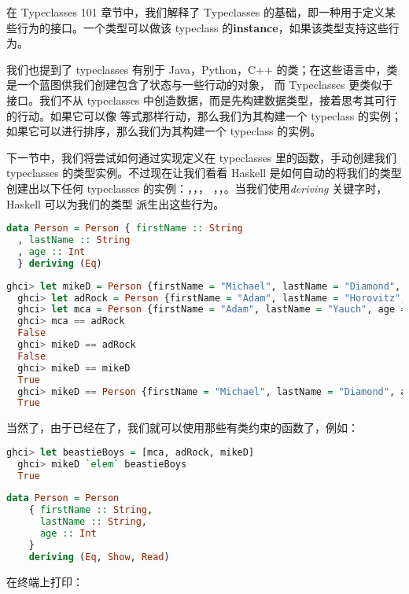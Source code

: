 \documentclass[./main.tex]{subfiles}
\begin{document}
在 Typeclasses 101 章节中，我们解释了 Typeclasses 的基础，即一种用于定义某些行为的接口。一个类型可以做该 typeclass
的\textbf{instance}，如果该类型支持这些行为。

我们也提到了 typeclasses 有别于 Java，Python，C++ 的类；在这些语言中，类是一个蓝图供我们创建包含了状态与一些行动的对象，
而 Typeclasses 更类似于接口。我们不从 typeclasses 中创造数据，而是先构建数据类型，接着思考其可行的行动。如果它可以像
等式那样行动，那么我们为其构建一个 typeclass 的实例；如果它可以进行排序，那么我们为其构建一个
typeclass 的实例。

下一节中，我们将尝试如何通过实现定义在 typeclasses 里的函数，手动创建我们 typeclasses 的类型实例。不过现在让我们看看
Haskell 是如何自动的将我们的类型创建出以下任何 typeclasses 的实例：，，，
，，。当我们使用\textit{deriving} 关键字时，Haskell 可以为我们的类型
派生出这些行为。

\begin{lstlisting}[language=Haskell]
  data Person = Person { firstName :: String
  , lastName :: String
  , age :: Int
  } deriving (Eq)
\end{lstlisting}

\begin{lstlisting}[language=Haskell]
  ghci> let mikeD = Person {firstName = "Michael", lastName = "Diamond", age = 43}
  ghci> let adRock = Person {firstName = "Adam", lastName = "Horovitz", age = 41}
  ghci> let mca = Person {firstName = "Adam", lastName = "Yauch", age = 44}
  ghci> mca == adRock
  False
  ghci> mikeD == adRock
  False
  ghci> mikeD == mikeD
  True
  ghci> mikeD == Person {firstName = "Michael", lastName = "Diamond", age = 43}
  True
\end{lstlisting}

当然了，由于已经在了，我们就可以使用那些有类约束的函数了，例如：

\begin{lstlisting}[language=Haskell]
  ghci> let beastieBoys = [mca, adRock, mikeD]
  ghci> mikeD `elem` beastieBoys
  True
\end{lstlisting}

\begin{lstlisting}[language=Haskell]
  data Person = Person
    { firstName :: String,
      lastName :: String,
      age :: Int
    }
    deriving (Eq, Show, Read)
\end{lstlisting}

在终端上打印：
\end{document}
